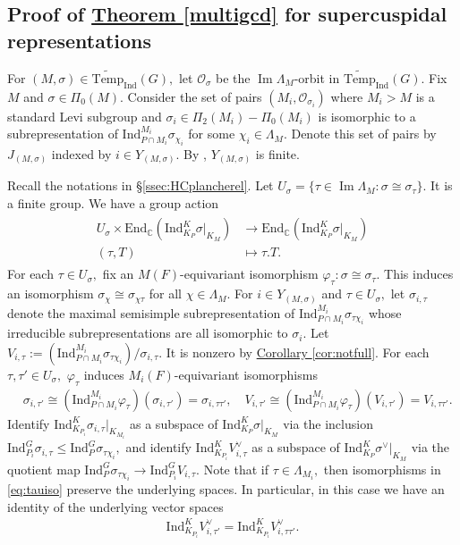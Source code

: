 \documentclass[10pt]{amsart}
\theoremstyle{definition}
\numberwithin{equation}{section}
\numberwithin{equation}{subsection}
\newcommand{\Ind}{\mathrm{Ind}}
\newcommand{\CC}{\mathbb{C}}
\renewcommand{\Im}{\mathop{\mathrm{Im}}}
\begin{document}
\subsection{Proof of \hyperref[multigcd]{Theorem \ref{multigcd}} for supercuspidal representations}\label{ssec:multigcd:cuspidal} For $(M,\sigma)\in \widetilde{\mathrm{Temp}}_{\mathrm{Ind}}(G),$ let $\mathcal{O}_\sigma$ be the $\Im\Lambda_M$-orbit in $\widetilde{\mathrm{Temp}}_{\mathrm{Ind}}(G)$. Fix $M$ and $\sigma\in \Pi_0(M)$.  Consider the set of pairs $(M_i,\mathcal{O}_{\sigma_i})$ where $M_i>M$ is a standard Levi subgroup and $\sigma_i\in \Pi_2(M_i)-\Pi_0(M_i)$ is isomorphic to a subrepresentation of $\Ind_{P\cap M_i}^{M_i} \sigma_{\chi_i}$ for some $\chi_i\in \Lambda_M.$ Denote this set of pairs by $J_{(M,\sigma)}$ indexed by $i\in Y_{(M,\sigma)}$. By \cite[Proposition 3.1]{BDK:TracePW}, $Y_{(M,\sigma)}$ is finite.  

Recall the notations in \S \ref{ssec:HCplancherel}. Let $U_\sigma=\{\tau\in \Im \Lambda_M: \sigma\cong \sigma_\tau\}.$ It is a finite group. We have a group action 
\begin{align}\label{eq:Usigmaaction}
\begin{split}
    U_\sigma\times \mathrm{End}_\CC (\Ind_{K_P}^K \sigma|_{K_M})&\longrightarrow \mathrm{End}_\CC (\Ind_{K_P}^K \sigma|_{K_M})\\
    (\tau,T)&\longmapsto  \tau.T.
\end{split}
\end{align}
For each $\tau\in U_\sigma,$ fix an $M(F)$-equivariant isomorphism $\varphi_\tau:\sigma\cong \sigma_\tau$. This induces an isomorphism $\sigma_\chi\cong \sigma_{\chi\tau}$ for all $\chi\in \Lambda_M.$ For $i\in Y_{(M,\sigma)}$ and $\tau\in U_\sigma,$ let $\sigma_{i,\tau}$ denote the maximal semisimple subrepresentation of $\Ind_{P\cap M_i}^{M_i} \sigma_{\tau\chi_i}$ whose irreducible subrepresentations are all isomorphic to $\sigma_i$. Let $V_{i,\tau}:=\left(\Ind_{P\cap M_i}^{M_i} \sigma_{\tau\chi_i}\right)/\sigma_{i,\tau}.$ It is nonzero by \hyperref[cor:notfull]{Corollary \ref{cor:notfull}}. For each $\tau,\tau'\in U_\sigma,$ $\varphi_\tau$ induces $M_i(F)$-equivariant isomorphisms
\begin{align}\label{eq:tauiso}
    &\sigma_{i,\tau'}\cong (\Ind^{M_i}_{P\cap M_i}\varphi_\tau)(\sigma_{i,\tau'})=\sigma_{i,\tau\tau'}, \quad V_{i,\tau'}\cong (\Ind^{M_i}_{P\cap M_i}\varphi_\tau)(V_{i,\tau'})=V_{i,\tau\tau'}.
\end{align} 
Identify $\mathrm{Ind}_{K_{P_i}}^K \sigma_{i,\tau}|_{K_{M_i}}$ as a subspace of $\mathrm{Ind}_{K_{P}}^{K} \sigma|_{K_M}$ via the inclusion $\Ind_{P_i}^G\sigma_{i,\tau}\le \Ind_{P}^G\sigma_{\tau\chi_i},$ and identify $\mathrm{Ind}_{K_{P_i}}^{K}V_{i,\tau}^\lor$ as a subspace of $\mathrm{Ind}_{K_P}^K \sigma^\lor|_{K_M}$ via the quotient map $\Ind_{P}^G \sigma_{\tau\chi_i}\to \Ind_{P_i}^G V_{i,\tau}.$ Note that if $\tau\in \Lambda_{M_i},$ then isomorphisms in \eqref{eq:tauiso} preserve the underlying spaces. In particular, in this case we have an identity of the underlying vector spaces
\begin{align*}
    \mathrm{Ind}_{K_{P_i}}^{K}V_{i,\tau'}^\lor=\mathrm{Ind}_{K_{P_i}}^{K}V_{i,\tau\tau'}^\lor.
\end{align*}
\end{document}
